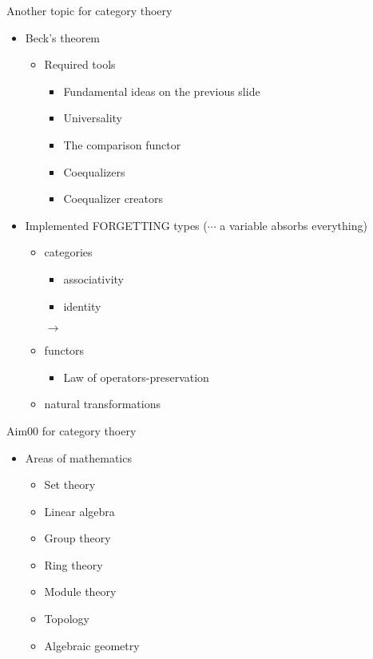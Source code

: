 \documentclass[dvipdfmx,10pt,notheorems]{beamer}
\renewcommand{\#}{^\sharp}
\begin{document}
	\begin{frame}{Another topic for category thoery}
		\begin{itemize}
			\item Beck's theorem
				\begin{itemize}
					\item Required tools
						\begin{itemize}
							\item Fundamental ideas on the previous slide
							\item Universality
							\item The comparison functor
							\item Coequalizers
							\item Coequalizer creators
						\end{itemize}
				\end{itemize}
			\item Implemented FORGETTING types ($\cdots$ a variable absorbs everything)
			\begin{itemize}
			\item categories
				\begin{itemize}
					\item associativity
					\item identity
				\end{itemize}
			\item[$\rightarrow$]
			\item functors
				\begin{itemize}
					\item Law of operators-preservation
				\end{itemize}
			\item natural transformations
			\end{itemize}
		\end{itemize}
	\end{frame}



	\begin{frame}{Aim00 for category thoery}
%
%
\begin{itemize}
%
%
\item Areas of mathematics
%
%
\begin{itemize}
%
\item Set theory
%
\item Linear algebra
%
\item Group theory

				\item Ring theory
				\item Module theory
				\item Topology
				\item Algebraic geometry
			\end{itemize}
		\end{itemize}
	\end{frame}
\end{document}
